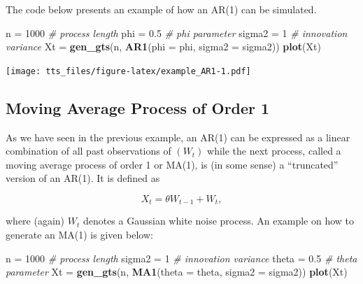 \documentclass[]{book}
\newenvironment{Shaded}{\begin{snugshade}}{\end{snugshade}}
\newcommand{\CommentTok}[1]{\textcolor[rgb]{0.56,0.35,0.01}{\textit{#1}}}
\newcommand{\DataTypeTok}[1]{\textcolor[rgb]{0.13,0.29,0.53}{#1}}
\newcommand{\DecValTok}[1]{\textcolor[rgb]{0.00,0.00,0.81}{#1}}
\newcommand{\FloatTok}[1]{\textcolor[rgb]{0.00,0.00,0.81}{#1}}
\newcommand{\KeywordTok}[1]{\textcolor[rgb]{0.13,0.29,0.53}{\textbf{#1}}}
\newcommand{\NormalTok}[1]{#1}
\newcommand{\StringTok}[1]{\textcolor[rgb]{0.31,0.60,0.02}{#1}}
\theoremstyle{definition}
\theoremstyle{definition}
\theoremstyle{definition}
\theoremstyle{remark}
\begin{document}
The code below presents an example of how an AR(1) can be simulated.

\begin{Shaded}
\begin{Highlighting}[]
\NormalTok{n =}\StringTok{ }\DecValTok{1000}                              \CommentTok{# process length}
\NormalTok{phi =}\StringTok{ }\FloatTok{0.5}                             \CommentTok{# phi parameter}
\NormalTok{sigma2 =}\StringTok{ }\DecValTok{1}                            \CommentTok{# innovation variance}
\NormalTok{Xt =}\StringTok{ }\KeywordTok{gen_gts}\NormalTok{(n, }\KeywordTok{AR1}\NormalTok{(}\DataTypeTok{phi =}\NormalTok{ phi, }\DataTypeTok{sigma2 =}\NormalTok{ sigma2))}
\KeywordTok{plot}\NormalTok{(Xt)}
\end{Highlighting}
\end{Shaded}

\texttt{[image: tts\_files/figure-latex/example\_AR1-1.pdf]}

\hypertarget{ma1}{%
\subsection{Moving Average Process of Order 1}\label{ma1}}

As we have seen in the previous example, an AR(1) can be expressed as a
linear combination of all past observations of \((W_t)\) while the next
process, called a moving average process of order 1 or MA(1), is (in
some sense) a ``truncated'' version of an AR(1). It is defined as

\begin{equation} 
  X_t = \theta W_{t-1} + W_t,
\end{equation}

where (again) \(W_t\) denotes a Gaussian white noise process. An example
on how to generate an MA(1) is given below:

\begin{Shaded}
\begin{Highlighting}[]
\NormalTok{n =}\StringTok{ }\DecValTok{1000}                              \CommentTok{# process length}
\NormalTok{sigma2 =}\StringTok{ }\DecValTok{1}                            \CommentTok{# innovation variance}
\NormalTok{theta =}\StringTok{ }\FloatTok{0.5}                           \CommentTok{# theta parameter}
\NormalTok{Xt =}\StringTok{ }\KeywordTok{gen_gts}\NormalTok{(n, }\KeywordTok{MA1}\NormalTok{(}\DataTypeTok{theta =}\NormalTok{ theta, }\DataTypeTok{sigma2 =}\NormalTok{ sigma2))}
\KeywordTok{plot}\NormalTok{(Xt)}
\end{Highlighting}
\end{Shaded}
\end{document}

